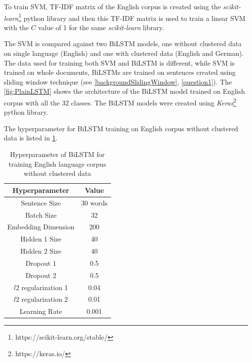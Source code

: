 To train \gls{SVM}, \gls{TF-IDF} matrix of the English corpus is created using the \textit{scikit-learn}\footnote{https://scikit-learn.org/stable/} python library and then this \gls{TF-IDF} matrix is used to train a linear \gls{SVM} with the $C$ value of 1 for the same \textit{scikit-learn} library. 

The \gls{SVM} is compared against two \gls{BiLSTM} models, one without clustered data on single language (English) and one with clustered data (English and German). The data used for training both \gls{SVM} and \gls{BiLSTM} is different, while \gls{SVM} is trained on whole documents, \glspl{BiLSTM} are trained on sentences created using sliding window technique (see \ref{backgroundSlidingWindow}, \ref{question1}). The \ref{fig:PlainLSTM} shows the architecture of the \gls{BiLSTM} model trained on English corpus with all the 32 classes. The \gls{BiLSTM} models were created using \textit{Keras}\footnote{https://keras.io/} python library. 

The hyperparameter for \gls{BiLSTM} training on English corpus without clustered data is listed in \ref{table:hyperparameterLSTM32class}. 

\begin{table}[!ht]
\centering
\begin{tabular}{cc}
\hline
\textbf{Hyperparameter} & \textbf{Value} \\ \hline
Sentence Size & 30 words \\
Batch Size & 32 \\
Embedding Dimension & 200 \\
Hidden 1 Size & 40 \\
Hidden 2 Size & 40 \\
Dropout 1 & 0.5 \\
Dropout 2 & 0.5 \\
$l2$ regularization 1 & 0.04 \\
$l2$ regularization 2 & 0.01 \\
Learning Rate & 0.001 \\ \hline
\end{tabular}
 \captionsetup{justification=centering,margin=2cm}
\caption{Hyperparameter of \gls{BiLSTM} for training English language corpus without clustered data}
\label{table:hyperparameterLSTM32class}
\end{table}


